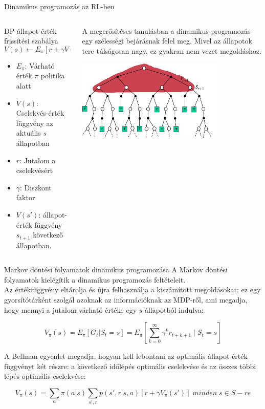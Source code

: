 \documentclass[english, aspectratio=169]{beamer}
\begin{document}
\begin{frame}{Dinamikus programozás az RL-ben}
\begin{columns}
\begin{column}{.5\textwidth}
\begin{block}{DP állapot-érték frissítési szabálya}
\[
V(s)\leftarrow E_{\pi}\left[r + \gamma V(s')\right]
\]
\begin{itemize}
	\item $E_{\pi}$: Várható érték $\pi$ politika alatt
	\item $V(s)$: Cselekvés-érték függvény az aktuális $s$ állapotban
	\item $r$: Jutalom a cselekvésért
	\item $\gamma$: Diszkont faktor
	\item $V(s')$: állapot-érték függvény $s_{t+1}$ következő állapotban.
\end{itemize}
\end{block}
\end{column}
\begin{column}{.5\textwidth}
A megerősítéses tanulásban a dinamikus programozás egy szélességi bejárásnak felel meg. Mivel az állapotok tere túlságosan nagy, ez gyakran nem vezet megoldáshoz. 
\begin{center}
\includegraphics[width=7cm, keepaspectratio]{images/solving_10}
\end{center}
\end{column}
\end{columns}
\end{frame}

\begin{frame}{Markov döntési folyamatok dinamikus programozása}
A Markov döntési folyamatok kielégítik a dinamikus programozás feltételeit.\\
Az értékfüggvény eltárolja és újra felhasználja a kiszámított megoldásokat: ez egy gyorsítótárként szolgál azoknak az információknak az MDP-ről, ami megadja, hogy mennyi a jutalom várható értéke egy $s$ állapotból indulva:
\begin{block}{}
\[
V_{\pi}(s)=E_{\pi}\left[G_{t}|S_{t}=s\right]=E_{\pi}\left[\sum_{k=0}^{\infty}\gamma^{k}r_{t+k+1}\mid S_{t}=s\right]
\]
\end{block}
A Bellman egyenlet megadja, hogyan kell lebontani az optimális állapot-érték függvényt két részre: a következő időlépés optimális cselekvése és az összes többi lépés optimális cselekvése:\\
\begin{block}{}
\[
V_{\pi}(s) = \sum_{a}\pi(a|s) \sum_{s',r}p\left(s',r|s,a\right) \left[ r + \gamma V_{\pi}\left(s'\right) \right] \; minden \; s \in S-re
\]
\end{block}
\end{frame}
\end{document}
